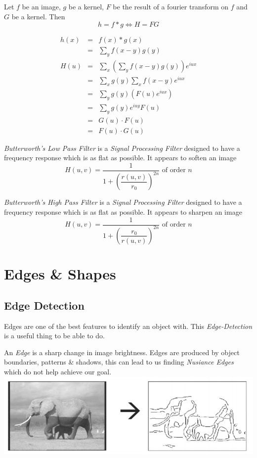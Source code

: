 \documentclass[11pt,a4paper]{article}
\begin{document}
Let $f$ be an image, $g$ be a kernel, $F$ be the result of a fourier transform on $f$ and $G$ be a kernel. Then
$$h=f*g\Longleftrightarrow H=FG$$

\[\begin{array}{rcl}
h(x)&=&f(x)*g(x)\\
&=&\sum_yf(x-y)g(y)\\
H(u)&=&\sum_x\left(\sum_yf(x-y)g(y)\right)e^{iux}\\
&=&\sum_xg(y)\sum_xf(x-y)e^{iux}\\
&=&\sum_yg(y)\left(F(u)e^{iux}\right)\\
&=&\sum_yg(y)e^{iuy}F(u)\\
&=&G(u)\cdot F(u)\\
&=&F(u)\cdot G(u)
\end{array}\]

\textit{Butterworth's Low Pass Filter} is a \textit{Signal Processing Filter} designed to have a frequency response which is as flat as possible. It appears to soften an image
$$H(u,v)=\frac{1}{1+\left(\dfrac{r(u,v)}{r_0}\right)^{2n}}\text{ of order $n$}$$

\textit{Butterworth's High Pass Filter} is a \textit{Signal Processing Filter} designed to have a frequency response which is as flat as possible. It appears to sharpen an image
$$H(u,v)=\frac{1}{1+\left(\dfrac{r_0}{r(u,v)}\right)^{2n}}\text{ of order $n$}$$

\section{Edges \& Shapes}

\subsection{Edge Detection}

Edges are one of the best features to identify an object with. This \textit{Edge-Detection} is a useful thing to be able to do.

An \textit{Edge} is a sharp change in image brightness. Edges are produced by object boundaries, patterns \& shadows, this can lead to us finding \textit{Nusiance Edges} which do not help achieve our goal.\\

\includegraphics[scale=.7]{img/edgeDetection.png}
\end{document}
